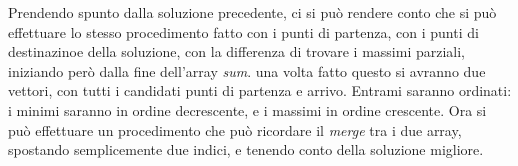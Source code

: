 \NLineare
Prendendo spunto dalla soluzione precedente, ci si può rendere conto che si può effettuare lo stesso procedimento fatto con i punti di partenza, con i punti di destinazinoe della soluzione, con la differenza di trovare i massimi parziali, iniziando però dalla fine dell'array \textit{sum}.
una volta fatto questo si avranno due vettori, con tutti i candidati punti di partenza e arrivo.
Entrami saranno ordinati: i minimi saranno in ordine decrescente, e i massimi in ordine crescente.
Ora si può effettuare un procedimento che può ricordare il \textit{merge} tra i due array, spostando semplicemente due indici, e tenendo conto della soluzione migliore.

\colorbox{white}{}
